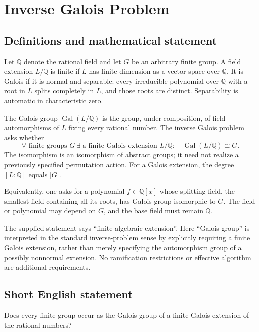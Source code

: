 \documentclass[11pt,a4paper]{article}
\begin{document}
\section*{Inverse Galois Problem}\label{statement}

\subsection{Definitions and mathematical statement}
Let $\mathbb Q$ denote the rational field and let $G$ be an arbitrary
finite group. A field extension $L/\mathbb Q$ is finite if $L$ has
finite dimension as a vector space over $\mathbb Q$. It is Galois
if it is normal and separable: every irreducible polynomial over
$\mathbb Q$ with a root in $L$ splits completely in $L$, and those
roots are distinct. Separability is automatic in characteristic zero.

The Galois group $\operatorname{Gal}(L/\mathbb Q)$ is the group,
under composition, of field automorphisms of $L$ fixing every
rational number. The inverse Galois problem asks whether
\[
 \forall\text{ finite groups }G\ \exists\text{ a finite Galois extension }
 L/\mathbb Q:\quad\operatorname{Gal}(L/\mathbb Q)\cong G.
\]
The isomorphism is an isomorphism of abstract groups; it need not
realize a previously specified permutation action. For a Galois
extension, the degree $[L:\mathbb Q]$ equals $|G|$.

Equivalently, one asks for a polynomial $f\in\mathbb Q[x]$ whose
splitting field, the smallest field containing all its roots, has
Galois group isomorphic to $G$. The field or polynomial may depend
on $G$, and the base field must remain $\mathbb Q$.

The supplied statement says ``finite algebraic extension''. Here
``Galois group'' is interpreted in the standard inverse-problem
sense by explicitly requiring a finite Galois extension, rather
than merely specifying the automorphism group of a possibly
nonnormal extension. No ramification restrictions or effective
algorithm are additional requirements.
\subsection{Short English statement}
Does every finite group occur as the Galois group of a finite Galois extension of the rational numbers?
\end{document}
